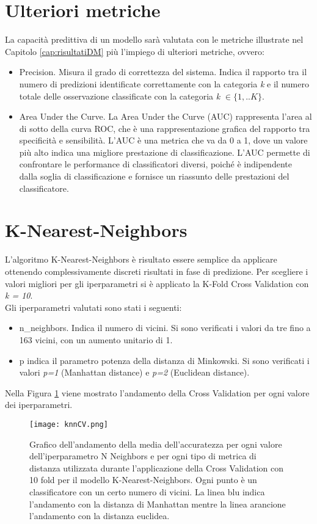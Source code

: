 \section{Ulteriori metriche}
La capacità predittiva di un modello sarà valutata con le metriche illustrate nel Capitolo \ref{cap:risultatiDM} più l'impiego di ulteriori metriche, ovvero:
\begin{itemize}
	\item \textsf{Precision}. Misura il grado di correttezza del sistema. Indica il rapporto tra il numero di predizioni identificate correttamente con la categoria \emph{k} e il numero totale delle osservazione classificate con la categoria \emph{k} $\in \{1,..K\}$.
	\item \textsf{Area Under the Curve}. La Area Under the Curve (AUC) rappresenta l'area al di sotto della curva ROC, che è una rappresentazione grafica del rapporto tra specificità e sensibilità.
	L'AUC è una metrica che va da 0 a 1, dove un valore più alto indica una migliore prestazione di classificazione. L'AUC permette di confrontare le performance di classificatori diversi, poiché è indipendente dalla soglia di classificazione e fornisce un riassunto delle prestazioni del classificatore.
\end{itemize}

\section{K-Nearest-Neighbors}
L'algoritmo K-Nearest-Neighbors è risultato essere semplice da applicare ottenendo complessivamente discreti risultati in fase di predizione. Per scegliere i valori migliori per gli iperparametri si è applicato la K-Fold Cross Validation con \emph{k = 10}.\\
Gli iperparametri valutati sono stati i seguenti:
\begin{itemize}
	\item \textsf{n\_neighbors}. Indica il numero di vicini. Si sono verificati i valori da tre fino a 163 vicini, con un aumento unitario di 1.
	\item \textsf{p} indica il parametro potenza della distanza di Minkowski. Si sono verificati i valori \emph{p=1} (Manhattan distance) e \emph{p=2} (Euclidean distance).
\end{itemize}

Nella Figura \ref{fig:knnCV} viene mostrato l'andamento della Cross Validation per ogni valore dei iperparametri.
\begin{figure}[h]
	\begin{center}
		\texttt{[image: knnCV.png]}
		\caption{Grafico dell'andamento della media dell'accuratezza per ogni valore dell'iperparametro N Neighbors e per ogni tipo di metrica di distanza utilizzata durante l'applicazione della Cross Validation con 10 fold per il modello K-Nearest-Neighbors. Ogni punto è un classificatore con un certo numero di vicini. La linea blu indica l'andamento con la distanza di Manhattan mentre la linea arancione l'andamento con la distanza euclidea.
		} 
		\label{fig:knnCV}
	\end{center}
\end{figure}

